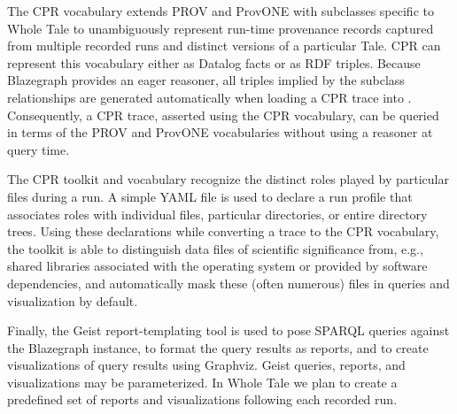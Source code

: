 The CPR vocabulary extends PROV and ProvONE \cite{provone_2015} with subclasses specific to Whole Tale to unambiguously represent run-time provenance records captured from multiple recorded runs and distinct versions of a particular Tale. CPR can represent this vocabulary either as Datalog facts or as RDF triples. Because Blazegraph provides an eager reasoner, all triples implied by the subclass relationships are generated automatically when loading a CPR trace into . Consequently, a CPR trace, asserted using the CPR vocabulary, can be queried in terms of the PROV and ProvONE vocabularies without using a reasoner at query time.

The CPR toolkit and vocabulary recognize the distinct roles played by particular files during a run. A simple YAML file is used to declare a run profile that associates roles with individual files, particular directories, or entire directory trees. Using these declarations while converting a  trace to the CPR vocabulary, the toolkit is able to distinguish data files of scientific significance from, e.g., shared libraries associated with the operating system or provided by software dependencies, and automatically mask these (often numerous) files in queries and visualization by default.

Finally, the Geist report-templating tool is used to pose SPARQL queries against the Blazegraph instance, to format the query results as reports, and to create visualizations of query results using Graphviz.  Geist queries, reports, and visualizations may be parameterized. In Whole Tale we plan to create a predefined set of reports and visualizations following each recorded run.
